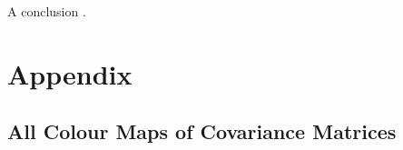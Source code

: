 \documentclass[a4paper, 10pt, conference]{ieeeconf}
\begin{document}
A conclusion \cite{pca}.




\onecolumn
\section*{Appendix}

\subsection*{All Colour Maps of Covariance Matrices}
\end{document}
